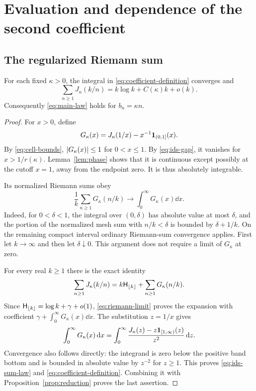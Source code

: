 \section{Evaluation and dependence of the second coefficient}
\label{sec:coefficient}

\subsection{The regularized Riemann sum}

\begin{proposition}
\label{prop:exact-law}
For each fixed $\kappa>0$, the integral in
\eqref{eq:coefficient-definition} converges and
\begin{equation}
 \sum_{n\ge1}J_\kappa(k/n)
           =k\log k+C(\kappa)k+o(k).
 \label{eq:ids-sum-law}
\end{equation}
Consequently \eqref{eq:main-law} holds for $b_n=\kappa n$.
\end{proposition}

\begin{proof}
For $x>0$, define
\begin{equation}
 G_\kappa(x)=J_\kappa(1/x)-x^{-1}\mathbf 1_{(0,1]}(x).
 \label{eq:regularized-summand}
\end{equation}
By \eqref{eq:cell-bounds}, $\lvert G_\kappa(x)\rvert\le1$
for $0<x\le1$. By \eqref{eq:ids-gap}, it vanishes for
$x>1/r(\kappa)$. Lemma~\ref{lem:phase} shows that it is
continuous except possibly at the cutoff $x=1$, away from
the endpoint zero. It is thus absolutely integrable.

Its normalized Riemann sums obey
\begin{equation}
 \frac1k\sum_{n\ge1}G_\kappa(n/k)
              \longrightarrow\int_0^\infty G_\kappa(x)\dd x.
 \label{eq:riemann-limit}
\end{equation}
Indeed, for $0<\delta<1$, the integral over $(0,\delta)$
has absolute value at most $\delta$, and the portion of the
normalized mesh sum with $n/k<\delta$ is bounded by
$\delta+1/k$. On the remaining compact interval ordinary
Riemann-sum convergence applies. First let $k\to\infty$
and then let $\delta\downarrow0$. This argument does not
require a limit of $G_\kappa$ at zero.

For every real $k\ge1$ there is the exact identity
\begin{equation}
 \sum_{n\ge1}J_\kappa(k/n)
        =k\mathsf H_{\lfloor k\rfloor}
                         +\sum_{n\ge1}G_\kappa(n/k).
 \label{eq:harmonic-separation}
\end{equation}
Since $\mathsf H_{\lfloor k\rfloor}=\log k+\gamma+o(1)$,
\eqref{eq:riemann-limit} proves the expansion with coefficient
$\gamma+\int_0^\infty G_\kappa(x)\dd x$.
The substitution $z=1/x$ gives
\[
 \int_0^\infty G_\kappa(x)\,\mathrm d x
       =\int_0^\infty
          \frac{J_\kappa(z)-z\mathbf 1_{[1,\infty)}(z)}{z^2}\,\mathrm d z.
\]
Convergence also follows directly: the integrand is zero
below the positive band bottom and is bounded in absolute
value by $z^{-2}$ for $z\ge1$.
This proves \eqref{eq:ids-sum-law} and
\eqref{eq:coefficient-definition}. Combining it with
Proposition~\ref{prop:reduction} proves the last assertion.
\end{proof}

